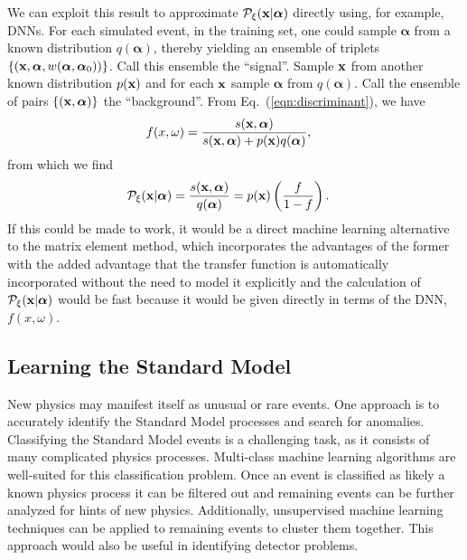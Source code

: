 We can exploit this result to approximate $\mathcal{P}_{\xi}({\bf x}|{\boldsymbol\alpha})$ directly using, for example, DNNs. For each simulated event, in the training set, one could sample $\boldsymbol{\alpha}$ from a known distribution $q(\boldsymbol{\alpha})$, thereby yielding an ensemble of triplets $\{ ({\bf x}, \boldsymbol{\alpha}, w(\boldsymbol{\alpha}, \boldsymbol{\alpha}_0)) \}$. Call this ensemble the ``signal''.
Sample ${\bf x}$ from another known distribution $p({\bf x})$ and for each ${\bf x}$ sample $\boldsymbol{\alpha}$ from $q(\boldsymbol{\alpha})$. Call the ensemble of pairs $\{({\bf x}, \boldsymbol{\alpha})\}$ the ``background''.
From Eq.~(\ref{eqn:discriminant}), we have
\begin{align}
 f(x, \omega) & = \frac{s({\bf x}, \boldsymbol{\alpha})}{s({\bf x}, \boldsymbol{\alpha}) + p({\bf x}) q(\boldsymbol{\alpha})},
\end{align}
from which we find
\begin{align}
 \mathcal{P}_{\xi}({\bf x}|{\boldsymbol\alpha}) & = \frac{s({\bf x}, {\boldsymbol\alpha})}{q(\boldsymbol{\alpha})} = p({\bf x}) \left( \frac{f}{1 - f} \right).
\end{align}
If this could be made to work, it would be a direct machine learning alternative to the matrix element method, which incorporates the advantages of the former with the added advantage that the transfer function is automatically incorporated without the need to model it explicitly and the calculation of $\mathcal{P}_{\xi}({\bf x}|{\boldsymbol\alpha})$ would be fast because it would be given directly in terms of the DNN, $f(x, \omega)$.

\subsection{Learning the Standard Model}

New physics may manifest itself as unusual or rare events. One approach is to accurately identify the Standard Model processes and search for anomalies. Classifying the Standard Model events is a challenging task, as it consists of many complicated physics processes. Multi-class machine learning algorithms are well-suited for this classification problem. Once an event is classified as likely a known physics process it can be filtered out and remaining events can be further analyzed for hints of new physics. Additionally, unsupervised machine learning techniques can be applied to remaining events to cluster them together. This approach would also be useful in identifying detector problems.

